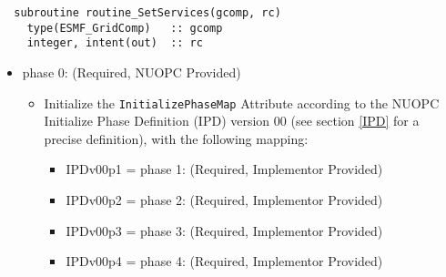 \begin{verbatim}  subroutine routine_SetServices(gcomp, rc)
    type(ESMF_GridComp)   :: gcomp
    integer, intent(out)  :: rc
\end{verbatim}

\begin{itemize}
\item phase 0: ({\sc Required, NUOPC Provided})
  \begin{itemize}
  \item Initialize the {\tt InitializePhaseMap} Attribute according to the NUOPC Initialize Phase Definition (IPD) version 00 (see section \ref{IPD} for a precise definition), with the following mapping:
    \begin{itemize}
    \item IPDv00p1 = phase 1: ({\sc Required, Implementor Provided})
    \item IPDv00p2 = phase 2: ({\sc Required, Implementor Provided})
    \item IPDv00p3 = phase 3: ({\sc Required, Implementor Provided})
    \item IPDv00p4 = phase 4: ({\sc Required, Implementor Provided})
    \end{itemize}  
  \end{itemize}  
\end{itemize}


